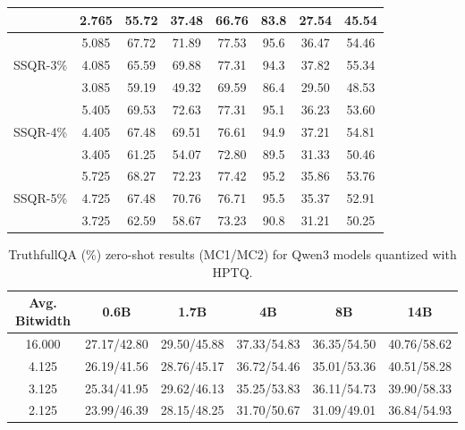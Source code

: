 \documentclass{article} %
\begin{document}
\begin{table}[htpb]
\begin{center}
\begin{tabular}{lccccccc}
 & 2.765 & 55.72 & 37.48 & 66.76 & 83.8 & 27.54 & 45.54 \\
\midrule
\multirow{3}{*}{SSQR-3\%}  
 & 5.085 & 67.72 & 71.89 & 77.53 & 95.6 & 36.47 & 54.46 \\
 & 4.085 & 65.59 & 69.88 & 77.31 & 94.3 & 37.82 & 55.34 \\
 & 3.085 & 59.19 & 49.32 & 69.59 & 86.4 & 29.50 & 48.53 \\
\midrule
\multirow{3}{*}{SSQR-4\%}  
 & 5.405 & 69.53 & 72.63 & 77.31 & 95.1 & 36.23 & 53.60 \\
 & 4.405 & 67.48 & 69.51 & 76.61 & 94.9 & 37.21 & 54.81 \\
 & 3.405 & 61.25 & 54.07 & 72.80 & 89.5 & 31.33 & 50.46 \\
\midrule
\multirow{3}{*}{SSQR-5\%}  
 & 5.725 & 68.27 & 72.23 & 77.42 & 95.2 & 35.86 & 53.76 \\
 & 4.725 & 67.48 & 70.76 & 76.71 & 95.5 & 35.37 & 52.91 \\
 & 3.725 & 62.59 & 58.67 & 73.23 & 90.8 & 31.21 & 50.25 \\
\bottomrule
\end{tabular}
\end{center}
\end{table}

\begin{table}[htpb]
\caption{TruthfullQA (\%) zero-shot results (MC1/MC2) for Qwen3 models quantized with HPTQ.}
\label{tab:all_truthfulqa}
\begin{center}
\begin{tabular}{cccccc}
\toprule
Avg. Bitwidth & 0.6B & 1.7B & 4B & 8B & 14B \\
\midrule
16.000 & 27.17/42.80 & 29.50/45.88 & 37.33/54.83 & 36.35/54.50 & 40.76/58.62 \\
\midrule
4.125 & 26.19/41.56 & 28.76/45.17 & 36.72/54.46 & 35.01/53.36 & 40.51/58.28 \\
\midrule
3.125 & 25.34/41.95 & 29.62/46.13 & 35.25/53.83 & 36.11/54.73 & 39.90/58.33 \\
\midrule
2.125 & 23.99/46.39 & 28.15/48.25 & 31.70/50.67 & 31.09/49.01 & 36.84/54.93 \\
\bottomrule
\end{tabular}
\end{center}
\end{table}
\end{document}
